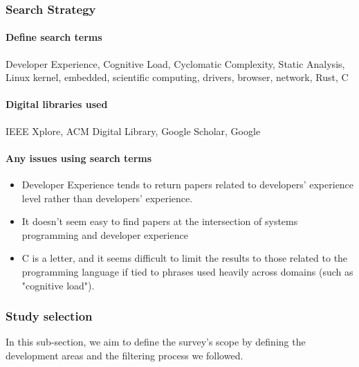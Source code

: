 \documentclass[conference]{IEEEtran}
\begin{document}
\subsubsection{Search Strategy}
\paragraph{\color{Black}Define search terms}{Developer Experience, Cognitive Load, Cyclomatic Complexity, Static Analysis,  Linux kernel, embedded, scientific computing, drivers, browser, network, Rust, C}
\paragraph{\color{Black}Digital libraries used} {IEEE Xplore, ACM Digital Library, Google Scholar, Google}
\paragraph{\color{Black}Any issues using search terms}{
    \begin{itemize}
        \item Developer Experience tends to return papers related to developers' experience level rather than developers' experience.
        \item It doesn't seem easy to find papers at the intersection of systems programming and developer experience
        \item C is a letter, and it seems difficult to limit the results to those related to the programming language if tied to phrases used heavily across domains (such as "cognitive load").
    \end{itemize}
}

\subsubsection{Study selection}
In this sub-section, we aim to define the survey's scope by defining the development areas and the filtering process we followed.
\end{document}
